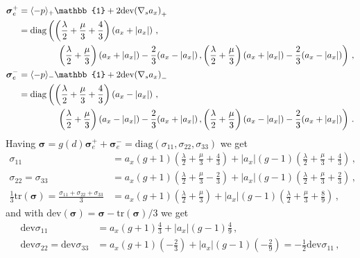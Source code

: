 \documentclass[11pt,a4paper]{article}
\newcommand{\bb}[1]{\boldsymbol{#1}}
\newcommand{\dev}{\text{dev}}
\newcommand{\tr}{\text{tr}}
\begin{document}
\begin{align*}
    \bb{\sigma}_e^+ 
    & = \langle -p \rangle_+ \mathbb{1} 
    + 2 \dev{(\nabla_s a_x)}_+
    \\
    & =
    \text{diag}
    \left(
    \left(\frac{\lambda}{2} + \frac{\mu}{3} + \frac{4}{3}\right)\left(a_x+|a_x|\right)
    \,,
    \right.
    \\
    & \hspace{1.5cm}
    \left.\left(\frac{\lambda}{2} + \frac{\mu}{3}\right)
    \left(a_x+|a_x|\right) - \frac{2}{3} (a_x-|a_x|)
    \,,
    \left(\frac{\lambda}{2} + \frac{\mu}{3}\right)
    \left(a_x+|a_x|\right) - \frac{2}{3} (a_x-|a_x|)
    \right)
    \,,
    \\
    \bb{\sigma}_e^- 
    & = \langle -p \rangle_- \mathbb{1} 
    + 2 \dev{(\nabla_s a_x)}_-
    \\
    & =
    \text{diag}
    \left(
    \left(\frac{\lambda}{2} + \frac{\mu}{3} + \frac{4}{3}\right)\left(a_x-|a_x|\right)
    \,,
    \right.
    \\
    & \hspace{1.5cm} 
    \left.
    \left(\frac{\lambda}{2} + \frac{\mu}{3}\right)
    \left(a_x-|a_x|\right) - \frac{2}{3} (a_x+|a_x|)
    \,,
    \left(\frac{\lambda}{2} + \frac{\mu}{3}\right)
    \left(a_x-|a_x|\right) - \frac{2}{3} (a_x+|a_x|)
    \right)
    \,.
\end{align*}
Having $\bb{\sigma} = g(d) \bb{\sigma}_e^+ + \bb{\sigma}_e^-
= \text{diag}(\sigma_{11}, \sigma_{22}, \sigma_{33})$ we get
\begin{align*}
    \sigma_{11} 
    & =
    a_x(g+1)\left( \frac{\lambda}{2} + \frac{\mu}{3} + \frac{4}{3}\right)
    +|a_x|(g-1)\left( \frac{\lambda}{2} + \frac{\mu}{3} + \frac{4}{3}\right)
    \,,
    \\
    \sigma_{22} 
    =
    \sigma_{33} 
    & =
    a_x(g+1)\left( \frac{\lambda}{2} + \frac{\mu}{3} - \frac{2}{3}\right)
    +|a_x|(g-1)\left( \frac{\lambda}{2} + \frac{\mu}{3} + \frac{2}{3}\right)
    \,,
    \\
    \frac{1}{3} \tr (\bb{\sigma}) 
    = \frac{\sigma_{11} + \sigma_{22} + \sigma_{33}}{3}
    &=
    a_x (g+1) \left( \frac{\lambda}{2} + \frac{\mu}{3}\right)
    + |a_x|(g-1) \left( \frac{\lambda}{2} + \frac{\mu}{3} + \frac{8}{9}
    \right)
    \,,
\end{align*}
and with $\dev(\bb{\sigma}) = \bb{\sigma} - \tr(\bb{\sigma})/3$ we get
\begin{align*}
    \dev \sigma_{11} 
    & =
    a_x(g+1)\frac{4}{3}
    +|a_x|(g-1)\frac{4}{9}
    \,,
    \\
    \dev \sigma_{22} 
    =
    \dev \sigma_{33} 
    & =
    a_x(g+1)\left( - \frac{2}{3}\right)
    +|a_x|(g-1)\left( - \frac{2}{9}\right)
    = -\frac{1}{2} \dev \sigma_{11}
    \,,
\end{align*}
\end{document}

